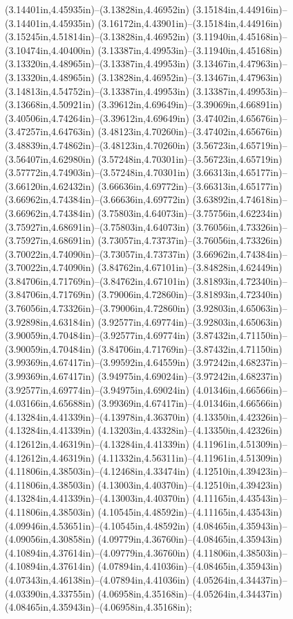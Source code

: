 (3.14401in,4.45935in)--(3.13828in,4.46952in) (3.15184in,4.44916in)--(3.14401in,4.45935in) (3.16172in,4.43901in)--(3.15184in,4.44916in) (3.15245in,4.51814in)--(3.13828in,4.46952in) (3.11940in,4.45168in)--(3.10474in,4.40400in) (3.13387in,4.49953in)--(3.11940in,4.45168in) (3.13320in,4.48965in)--(3.13387in,4.49953in) (3.13467in,4.47963in)--(3.13320in,4.48965in) (3.13828in,4.46952in)--(3.13467in,4.47963in) (3.14813in,4.54752in)--(3.13387in,4.49953in) (3.13387in,4.49953in)--(3.13668in,4.50921in) (3.39612in,4.69649in)--(3.39069in,4.66891in) (3.40506in,4.74264in)--(3.39612in,4.69649in) (3.47402in,4.65676in)--(3.47257in,4.64763in) (3.48123in,4.70260in)--(3.47402in,4.65676in) (3.48839in,4.74862in)--(3.48123in,4.70260in) (3.56723in,4.65719in)--(3.56407in,4.62980in) (3.57248in,4.70301in)--(3.56723in,4.65719in) (3.57772in,4.74903in)--(3.57248in,4.70301in) (3.66313in,4.65177in)--(3.66120in,4.62432in) (3.66636in,4.69772in)--(3.66313in,4.65177in) (3.66962in,4.74384in)--(3.66636in,4.69772in) (3.63892in,4.74618in)--(3.66962in,4.74384in) (3.75803in,4.64073in)--(3.75756in,4.62234in) (3.75927in,4.68691in)--(3.75803in,4.64073in) (3.76056in,4.73326in)--(3.75927in,4.68691in) (3.73057in,4.73737in)--(3.76056in,4.73326in) (3.70022in,4.74090in)--(3.73057in,4.73737in) (3.66962in,4.74384in)--(3.70022in,4.74090in) (3.84762in,4.67101in)--(3.84828in,4.62449in) (3.84706in,4.71769in)--(3.84762in,4.67101in) (3.81893in,4.72340in)--(3.84706in,4.71769in) (3.79006in,4.72860in)--(3.81893in,4.72340in) (3.76056in,4.73326in)--(3.79006in,4.72860in) (3.92803in,4.65063in)--(3.92898in,4.63184in) (3.92577in,4.69774in)--(3.92803in,4.65063in) (3.90059in,4.70484in)--(3.92577in,4.69774in) (3.87432in,4.71150in)--(3.90059in,4.70484in) (3.84706in,4.71769in)--(3.87432in,4.71150in) (3.99369in,4.67417in)--(3.99592in,4.64559in) (3.97242in,4.68237in)--(3.99369in,4.67417in) (3.94975in,4.69024in)--(3.97242in,4.68237in) (3.92577in,4.69774in)--(3.94975in,4.69024in) (4.01346in,4.66566in)--(4.03166in,4.65688in) (3.99369in,4.67417in)--(4.01346in,4.66566in) (4.13284in,4.41339in)--(4.13978in,4.36370in) (4.13350in,4.42326in)--(4.13284in,4.41339in) (4.13203in,4.43328in)--(4.13350in,4.42326in) (4.12612in,4.46319in)--(4.13284in,4.41339in) (4.11961in,4.51309in)--(4.12612in,4.46319in) (4.11332in,4.56311in)--(4.11961in,4.51309in) (4.11806in,4.38503in)--(4.12468in,4.33474in) (4.12510in,4.39423in)--(4.11806in,4.38503in) (4.13003in,4.40370in)--(4.12510in,4.39423in) (4.13284in,4.41339in)--(4.13003in,4.40370in) (4.11165in,4.43543in)--(4.11806in,4.38503in) (4.10545in,4.48592in)--(4.11165in,4.43543in) (4.09946in,4.53651in)--(4.10545in,4.48592in) (4.08465in,4.35943in)--(4.09056in,4.30858in) (4.09779in,4.36760in)--(4.08465in,4.35943in) (4.10894in,4.37614in)--(4.09779in,4.36760in) (4.11806in,4.38503in)--(4.10894in,4.37614in) (4.07894in,4.41036in)--(4.08465in,4.35943in) (4.07343in,4.46138in)--(4.07894in,4.41036in) (4.05264in,4.34437in)--(4.03390in,4.33755in) (4.06958in,4.35168in)--(4.05264in,4.34437in) (4.08465in,4.35943in)--(4.06958in,4.35168in);
